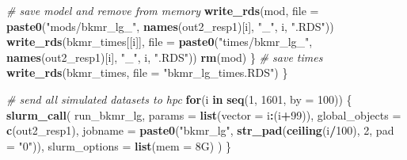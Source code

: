\documentclass[12pt, twoside]{amherstthesis}
\newenvironment{Shaded}{\begin{snugshade}}{\end{snugshade}}
\newcommand{\AttributeTok}[1]{\textcolor[rgb]{0.13,0.29,0.53}{#1}}
\newcommand{\CommentTok}[1]{\textcolor[rgb]{0.56,0.35,0.01}{\textit{#1}}}
\newcommand{\ControlFlowTok}[1]{\textcolor[rgb]{0.13,0.29,0.53}{\textbf{#1}}}
\newcommand{\DecValTok}[1]{\textcolor[rgb]{0.00,0.00,0.81}{#1}}
\newcommand{\FunctionTok}[1]{\textcolor[rgb]{0.13,0.29,0.53}{\textbf{#1}}}
\newcommand{\NormalTok}[1]{#1}
\newcommand{\SpecialCharTok}[1]{\textcolor[rgb]{0.81,0.36,0.00}{\textbf{#1}}}
\newcommand{\StringTok}[1]{\textcolor[rgb]{0.31,0.60,0.02}{#1}}
\begin{document}
\begin{Shaded}
\begin{Highlighting}[]
    \CommentTok{\# save model and remove from memory}
    \FunctionTok{write\_rds}\NormalTok{(mod, }\AttributeTok{file =} \FunctionTok{paste0}\NormalTok{(}\StringTok{"mods/bkmr\_lg\_"}\NormalTok{, }\FunctionTok{names}\NormalTok{(out2\_resp1)[i], }\StringTok{"\_"}\NormalTok{, i, }\StringTok{".RDS"}\NormalTok{))}
    \FunctionTok{write\_rds}\NormalTok{(bkmr\_times[[i]], }\AttributeTok{file =} 
                \FunctionTok{paste0}\NormalTok{(}\StringTok{"times/bkmr\_lg\_"}\NormalTok{, }\FunctionTok{names}\NormalTok{(out2\_resp1)[i], }\StringTok{"\_"}\NormalTok{, i, }\StringTok{".RDS"}\NormalTok{))}
    \FunctionTok{rm}\NormalTok{(mod)}
\NormalTok{  \}}
  \CommentTok{\# save times}
  \FunctionTok{write\_rds}\NormalTok{(bkmr\_times, }\AttributeTok{file =} \StringTok{"bkmr\_lg\_times.RDS"}\NormalTok{)}
\NormalTok{\}}

\CommentTok{\# send all simulated datasets to hpc}
\ControlFlowTok{for}\NormalTok{(i }\ControlFlowTok{in} \FunctionTok{seq}\NormalTok{(}\DecValTok{1}\NormalTok{, }\DecValTok{1601}\NormalTok{, }\AttributeTok{by =} \DecValTok{100}\NormalTok{)) \{}
  \FunctionTok{slurm\_call}\NormalTok{(}
\NormalTok{    run\_bkmr\_lg,}
    \AttributeTok{params =} \FunctionTok{list}\NormalTok{(}\AttributeTok{vector =}\NormalTok{ i}\SpecialCharTok{:}\NormalTok{(i}\SpecialCharTok{+}\DecValTok{99}\NormalTok{)),}
    \AttributeTok{global\_objects =} \FunctionTok{c}\NormalTok{(}\StringTok{\textquotesingle{}out2\_resp1\textquotesingle{}}\NormalTok{),}
    \AttributeTok{jobname =} \FunctionTok{paste0}\NormalTok{(}\StringTok{"bkmr\_lg"}\NormalTok{, }\FunctionTok{str\_pad}\NormalTok{(}\FunctionTok{ceiling}\NormalTok{(i}\SpecialCharTok{/}\DecValTok{100}\NormalTok{), }\DecValTok{2}\NormalTok{, }\AttributeTok{pad =} \StringTok{"0"}\NormalTok{)),}
    \AttributeTok{slurm\_options =} \FunctionTok{list}\NormalTok{(}\AttributeTok{mem =} \StringTok{\textquotesingle{}8G\textquotesingle{}}\NormalTok{)}
\NormalTok{  )}
\NormalTok{\}}
\end{Highlighting}
\end{Shaded}
\normalsize
\end{document}
